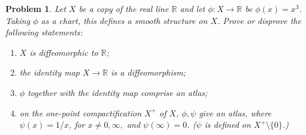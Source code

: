 \documentclass[10pt]{article}
\newcommand{\bb}[1]{\mathbb{#1}}
\theoremstyle{plain}
\newtheorem{problem}{Problem}
\theoremstyle{remark}
\begin{document}
\begin{problem}
  Let $X$ be a copy of the real line $\bb{R}$ and let $\phi:X\rightarrow\bb{R}$ be
  $\phi(x)=x^3$. Taking $\phi$ as a chart, this defines a smooth structure on
  $X$. Prove or disprove the following statements:
  \begin{enumerate}
  \item $X$ is diffeomorphic to $\bb{R}$;
  \item the identity map $X\rightarrow\bb{R}$ is a diffeomorphism;
  \item $\phi$ together with the identity map comprise an atlas;
  \item on the one-point compactification $X^+$ of $X$, $\phi,\psi$ give an
    atlas, where $\psi(x)=1/x$, for $x\neq 0,\infty,$ and $\psi(\infty)=0$. ($\psi$ is defined
    on $X^+\setminus\{0\}$.)
  \end{enumerate}
\end{problem}



\end{document}
